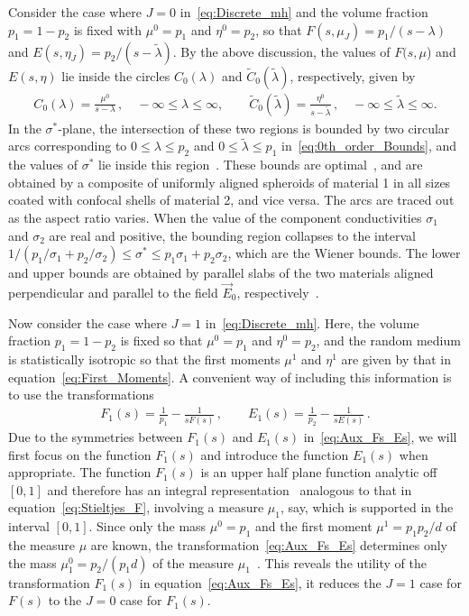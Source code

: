 \documentclass{cmslatex}
\begin{document}
Consider the case where $J=0$  in~\eqref{eq:Discrete_mh} and the
volume fraction $p_1=1-p_2$ is fixed with $\mu^0=p_1$ and
$\eta^0=p_2$, so that $F(s,\mu_J)=p_1/(s-\lambda)$ and
$E(s,\eta_J)=p_2/(s-\tilde{\lambda})$. By the above discussion, the values of 
$F(s,\mu$) and $E(s,\eta)$ lie inside the circles $C_0(\lambda)$ and
$\tilde{C}_0(\tilde{\lambda})$, respectively, given by  
%
\begin{align}\label{eq:0th_order_Bounds}
    C_0(\lambda)=\frac{\mu^0}{s-\lambda}\,, \quad -\infty\leq\lambda\leq \infty, \qquad
    \tilde{C}_0(\tilde{\lambda})=\frac{\eta^0}{s-\tilde{\lambda}}\,, \quad
    -\infty\leq\tilde{\lambda}\leq \infty. 
\end{align}
%
In the $\sigma^*$-plane, the intersection of these two regions is bounded by
two circular arcs corresponding to $0\leq\lambda\leq p_2$ and $0\leq\tilde{\lambda}\leq p_1$
in~\eqref{eq:0th_order_Bounds}, and the values of $\sigma^*$ lie inside
this region~\cite{Golden:JMPS-333}. These bounds are
optimal~\cite{Milton:JAP-5286,Bergman:AP-78}, and are obtained by a
composite of uniformly aligned spheroids of material 1 in all sizes coated with
confocal shells of material 2, and vice versa. The arcs are traced out
as the aspect ratio varies. When the value of the component
conductivities $\sigma_1$ and $\sigma_2$ are real and positive, the bounding
region collapses to the interval
$1/(p_1/\sigma_1+p_2/\sigma_2)\leq\sigma^*\leq p_1\sigma_1+p_2\sigma_2$, which are the Wiener
bounds. The lower and upper bounds are obtained by parallel slabs of
the two materials aligned perpendicular and parallel to the field
$\vec{E}_0$, respectively~\cite{Scaife-1989}.



Now consider the case where $J=1$ in~\eqref{eq:Discrete_mh}. Here, the
volume fraction $p_1=1-p_2$ is 
fixed so that $\mu^0=p_1$ and $\eta^0=p_2$, and the random medium is
statistically isotropic so that the first moments $\mu^1$ and $\eta^1$ are
given by that in equation~\eqref{eq:First_Moments}.  A convenient way
of including this information is to use the
transformations~\cite{Bergman:AP-78}   
%
\begin{align}\label{eq:Aux_Fs_Es}
  F_1(s)=\frac{1}{p_1}-\frac{1}{sF(s)}\,, \qquad
  E_1(s)=\frac{1}{p_2}-\frac{1}{sE(s)}\,.
\end{align}
%
Due to the symmetries between $F_1(s)$ and $E_1(s)$
in~\eqref{eq:Aux_Fs_Es}, we will first focus on the function $F_1(s)$
and introduce the function $E_1(s)$ when appropriate. The function
$F_1(s)$ is an upper half plane function analytic off $[0,1]$ and
therefore has an integral
representation~\cite{Bergman:AP-78,Golden:JMPS-333} analogous to that
in equation~\eqref{eq:Stieltjes_F}, involving a
measure $\mu_1$, say, which is supported in the interval $[0,1]$. Since
only the mass $\mu^0=p_1$ and the first moment $\mu^1=p_1p_2/d$ of the
measure $\mu$ are known, the transformation~\eqref{eq:Aux_Fs_Es}
determines only the mass $\mu_1^0=p_2/(p_1d)$ of the measure
$\mu_1$~\cite{Bergman:AP-78,Golden:JMPS-333}. This reveals the utility
of the transformation $F_1(s)$ in equation~\eqref{eq:Aux_Fs_Es}, it
reduces the $J=1$ case for $F(s)$ to the $J=0$ case for $F_1(s)$.
\end{document}
